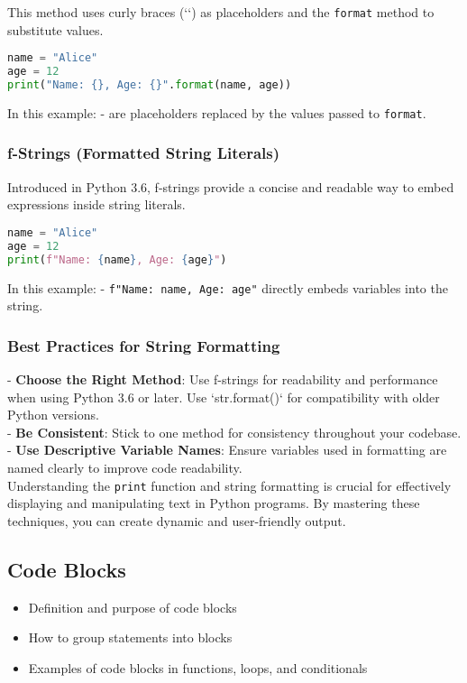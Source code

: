 This method uses curly braces (`{}`) as placeholders and the \texttt{format} method to substitute values.

\begin{lstlisting}[language=Python, caption=str.format() Method Example]
name = "Alice"
age = 12
print("Name: {}, Age: {}".format(name, age))
\end{lstlisting}

In this example:
- \texttt{{}{}} are placeholders replaced by the values passed to \texttt{format}.

\subsubsection{f-Strings (Formatted String Literals)}

Introduced in Python 3.6, f-strings provide a concise and readable way to embed expressions inside string literals.

\begin{lstlisting}[language=Python, caption=f-Strings Example]
name = "Alice"
age = 12
print(f"Name: {name}, Age: {age}")
\end{lstlisting}

In this example:
- \texttt{f"Name: {name}, Age: {age}"} directly embeds variables into the string.

\subsubsection{Best Practices for String Formatting}

- \textbf{Choose the Right Method}: Use f-strings for readability and performance when using Python 3.6 or later. Use `str.format()` for compatibility with older Python versions.
\\
- \textbf{Be Consistent}: Stick to one method for consistency throughout your codebase.
\\
- \textbf{Use Descriptive Variable Names}: Ensure variables used in formatting are named clearly to improve code readability.
\\
Understanding the \texttt{print} function and string formatting is crucial for effectively displaying and manipulating text in Python programs. By mastering these techniques, you can create dynamic and user-friendly output.

\subsection{Code Blocks}
\begin{itemize}
    \item Definition and purpose of code blocks
    \item How to group statements into blocks
    \item Examples of code blocks in functions, loops, and conditionals
\end{itemize}


